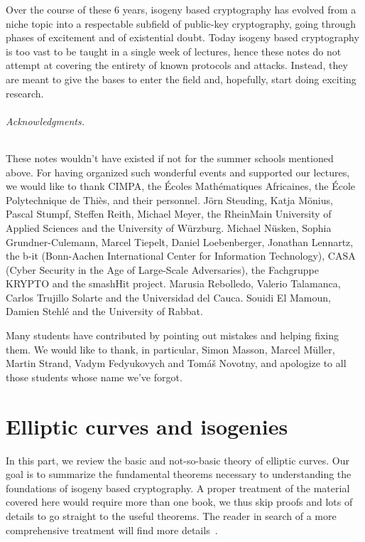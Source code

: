 \documentclass[10pt]{article}
\theoremstyle{plain}
\theoremstyle{definition}
\begin{document}
Over the course of these 6 years, isogeny based cryptography has
evolved from a niche topic into a respectable subfield of public-key
cryptography, going through phases of excitement and of existential
doubt. %
Today isogeny based cryptography is too vast to be taught in a single
week of lectures, hence these notes do not attempt at covering the
entirety of known protocols and attacks. %
Instead, they are meant to give the bases to enter the field and,
hopefully, start doing exciting research.

\paragraph{Acknowledgments.}
These notes wouldn't have existed if not for the summer schools
mentioned above. %
For having organized such wonderful events and supported our lectures,
we would like to thank CIMPA, the Écoles Mathématiques Africaines, the
École Polytechnique de Thiès, and their personnel. %
Jörn Steuding, Katja Mönius, Pascal Stumpf, Steffen Reith, Michael
Meyer, the RheinMain University of Applied Sciences and the University
of Würzburg. %
Michael Nüsken, Sophia Grundner-Culemann, Marcel Tiepelt, Daniel
Loebenberger, Jonathan Lennartz, the b-it (Bonn-Aachen International
Center for Information Technology), CASA (Cyber Security in the Age of
Large-Scale Adversaries), the Fachgruppe KRYPTO and the smashHit
project. %
Marusia Rebolledo, Valerio Talamanca, Carlos Trujillo Solarte and the
Universidad del Cauca. %
Souidi El Mamoun, Damien Stehlé and the University of Rabbat.

Many students have contributed by pointing out mistakes and helping
fixing them. %
We would like to thank, in particular, Simon Masson, Marcel Müller,
Martin Strand, Vadym Fedyukovych and Tomáš Novotny, and apologize
to all those students whose name we've forgot.

\clearpage
{
  \hypersetup{linkcolor=black}
  \setcounter{tocdepth}{1}
  \tableofcontents
}


\clearpage
\part{Elliptic curves and isogenies}

In this part, we review the basic and not-so-basic theory of elliptic
curves. %
Our goal is to summarize the fundamental theorems necessary to
understanding the foundations of isogeny based cryptography. %
A proper treatment of the material covered here would require more
than one book, we thus skip proofs and lots of details to go straight
to the useful theorems. %
The reader in search of a more comprehensive treatment will find more
details~\cite{silverman:elliptic,silverman:advanced,lang1987elliptic,neukirch2013algebraic}. %
\end{document}

